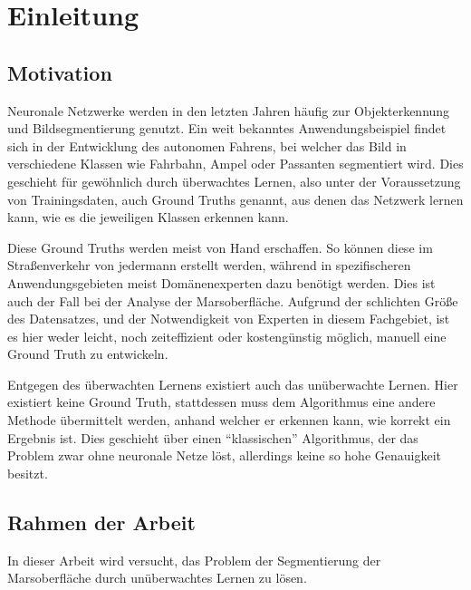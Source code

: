 \chapter{Einleitung}
\label{chap:einleitung}

\section{Motivation}

Neuronale Netzwerke werden in den letzten Jahren häufig zur Objekterkennung und Bildsegmentierung genutzt. Ein weit bekanntes Anwendungsbeispiel findet sich in der Entwicklung des autonomen Fahrens, bei welcher das Bild in verschiedene Klassen wie \zB Fahrbahn, Ampel oder Passanten segmentiert wird. Dies geschieht für gewöhnlich durch überwachtes Lernen, also unter der Voraussetzung von Trainingsdaten, auch Ground Truths genannt, aus denen das Netzwerk lernen kann, wie es die jeweiligen Klassen erkennen kann.

Diese Ground Truths werden meist von Hand erschaffen. So können diese im Straßenverkehr von jedermann erstellt werden, während in spezifischeren Anwendungsgebieten meist Domänenexperten dazu benötigt werden. Dies ist auch der Fall bei der Analyse der Marsoberfläche. Aufgrund der schlichten Größe des Datensatzes, und der Notwendigkeit von Experten in diesem Fachgebiet, ist es hier weder leicht, noch zeiteffizient oder kostengünstig möglich, manuell eine Ground Truth zu entwickeln.

Entgegen des überwachten Lernens existiert auch das unüberwachte Lernen. Hier existiert keine Ground Truth, stattdessen muss dem Algorithmus eine andere Methode übermittelt werden, anhand welcher er erkennen kann, wie korrekt ein Ergebnis ist. Dies geschieht \zB über einen \enquote{klassischen} Algorithmus, der das Problem zwar ohne neuronale Netze löst, allerdings keine so hohe Genauigkeit besitzt.

\section{Rahmen der Arbeit}

In dieser Arbeit wird versucht, das Problem der Segmentierung der Marsoberfläche durch unüberwachtes Lernen zu lösen.
